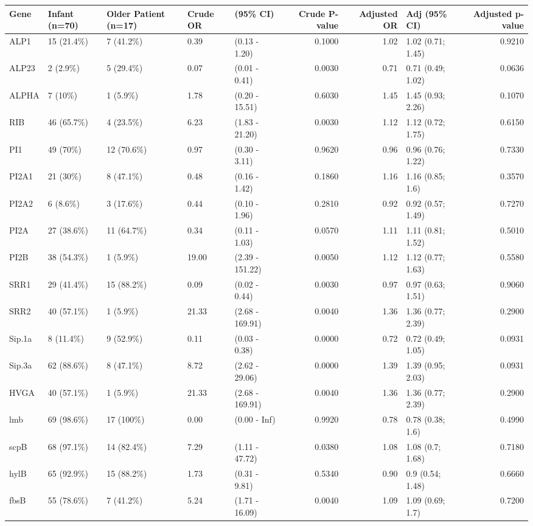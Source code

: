 \begin{table}[ht]
\centering
\begin{tabular}{lllllrrlr}
  \hline
Gene & Infant (n=70) & Older Patient (n=17) & Crude OR & (95\% CI) & Crude P-value & Adjusted OR & Adj (95\% CI) & Adjusted p-value \\ 
  \hline
ALP1 & 15 (21.4\%) & 7 (41.2\%) & 0.39 & (0.13 - 1.20) & 0.1000 & 1.02 & 1.02 (0.71; 1.45) & 0.9210 \\ 
  ALP23 & 2 (2.9\%) & 5 (29.4\%) & 0.07 & (0.01 - 0.41) & 0.0030 & 0.71 & 0.71 (0.49; 1.02) & 0.0636 \\ 
  ALPHA & 7 (10\%) & 1 (5.9\%) & 1.78 & (0.20 - 15.51) & 0.6030 & 1.45 & 1.45 (0.93; 2.26) & 0.1070 \\ 
  RIB & 46 (65.7\%) & 4 (23.5\%) & 6.23 & (1.83 - 21.20) & 0.0030 & 1.12 & 1.12 (0.72; 1.75) & 0.6150 \\ 
  PI1 & 49 (70\%) & 12 (70.6\%) & 0.97 & (0.30 - 3.11) & 0.9620 & 0.96 & 0.96 (0.76; 1.22) & 0.7330 \\ 
  PI2A1 & 21 (30\%) & 8 (47.1\%) & 0.48 & (0.16 - 1.42) & 0.1860 & 1.16 & 1.16 (0.85; 1.6) & 0.3570 \\ 
  PI2A2 & 6 (8.6\%) & 3 (17.6\%) & 0.44 & (0.10 - 1.96) & 0.2810 & 0.92 & 0.92 (0.57; 1.49) & 0.7270 \\ 
  PI2A & 27 (38.6\%) & 11 (64.7\%) & 0.34 & (0.11 - 1.03) & 0.0570 & 1.11 & 1.11 (0.81; 1.52) & 0.5010 \\ 
  PI2B & 38 (54.3\%) & 1 (5.9\%) & 19.00 & (2.39 - 151.22) & 0.0050 & 1.12 & 1.12 (0.77; 1.63) & 0.5580 \\ 
  SRR1 & 29 (41.4\%) & 15 (88.2\%) & 0.09 & (0.02 - 0.44) & 0.0030 & 0.97 & 0.97 (0.63; 1.51) & 0.9060 \\ 
  SRR2 & 40 (57.1\%) & 1 (5.9\%) & 21.33 & (2.68 - 169.91) & 0.0040 & 1.36 & 1.36 (0.77; 2.39) & 0.2900 \\ 
  Sip.1a & 8 (11.4\%) & 9 (52.9\%) & 0.11 & (0.03 - 0.38) & 0.0000 & 0.72 & 0.72 (0.49; 1.05) & 0.0931 \\ 
  Sip.3a & 62 (88.6\%) & 8 (47.1\%) & 8.72 & (2.62 - 29.06) & 0.0000 & 1.39 & 1.39 (0.95; 2.03) & 0.0931 \\ 
  HVGA & 40 (57.1\%) & 1 (5.9\%) & 21.33 & (2.68 - 169.91) & 0.0040 & 1.36 & 1.36 (0.77; 2.39) & 0.2900 \\ 
  lmb & 69 (98.6\%) & 17 (100\%) & 0.00 & (0.00 - Inf) & 0.9920 & 0.78 & 0.78 (0.38; 1.6) & 0.4990 \\ 
  scpB & 68 (97.1\%) & 14 (82.4\%) & 7.29 & (1.11 - 47.72) & 0.0380 & 1.08 & 1.08 (0.7; 1.68) & 0.7180 \\ 
  hylB & 65 (92.9\%) & 15 (88.2\%) & 1.73 & (0.31 - 9.81) & 0.5340 & 0.90 & 0.9 (0.54; 1.48) & 0.6660 \\ 
  fbsB & 55 (78.6\%) & 7 (41.2\%) & 5.24 & (1.71 - 16.09) & 0.0040 & 1.09 & 1.09 (0.69; 1.7) & 0.7200 \\ 
   \hline
\end{tabular}
\end{table}
